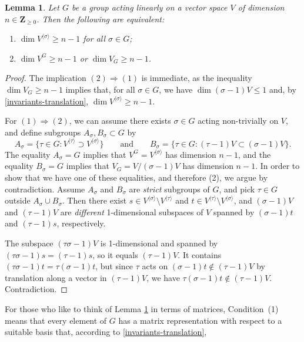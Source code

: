 \documentclass{amsart}
\theoremstyle{plain}
\newtheorem{lemma}[theorem]{Lemma}
\theoremstyle{definition}
\newcommand{\Zee}{{\mathbf{Z}}}
\begin{document}
\begin{lemma}
\label{lemma:groupactions}
Let $G$ be a group acting linearly on a vector space $V$ of 
dimension $n\in\Zee_{\ge0}$.
Then the following are equivalent:
\begin{enumerate}
\item
$\dim V^{\langle\sigma\rangle}\ge n-1$ for all $\sigma \in G$;
\item
$\dim V^G\ge n-1$ or\/  $\dim V_G\ge n-1$.
\end{enumerate}
\end{lemma}
\begin{proof}
The implication $(2)\Rightarrow(1)$ is immediate, as the inequality
$\dim V_G\ge n-1$
implies that, for all $\sigma\in G$,
we have $\dim (\sigma-1)V \le 1$ and,
by \eqref{invariants-translation}, 
$\dim V^{\langle\sigma\rangle}\ge n-1$.

For $(1)\Rightarrow (2)$, we can assume 
there exists $\sigma\in G$ acting non-trivially on $V$,
and define subgroups $A_\sigma, B_\sigma \subset G$ by
$$
A_\sigma=
  \{\tau\in G\colon V^{\langle\tau\rangle} \supset V^{\langle\sigma\rangle} \}
\qquad\text{and}\qquad
B_\sigma=
  \{\tau\in G\colon (\tau-1)V \subset (\sigma-1)V \}.
$$
The equality $A_\sigma=G$ implies that $V^G=V^{\langle\sigma\rangle}$
has dimension $n-1$, and the equality $B_\sigma=G$ implies that 
$V_G=V/(\sigma-1)V$ has dimension $n-1$.
In order to show that we have one of these equalities, and therefore (2),
we argue by contradiction. 
Assume $A_\sigma$ and $B_\sigma$ are \emph{strict} subgroups of $G$, and
pick $\tau\in G$ outside $A_\sigma\cup B_\sigma$.
Then there exist 
$s\in V^{\langle\sigma\rangle}\setminus V^{\langle\tau\rangle}$
and
$t\in V^{\langle\tau\rangle}\setminus V^{\langle\sigma\rangle}$,
and $(\sigma-1)V$ and $(\tau-1)V$ are \emph{different} 1-dimensional
subspaces of $V$ spanned by $(\sigma-1) t$ and $(\tau-1)s$, respectively.

The subspace $(\tau\sigma-1)V$ is 1-dimensional and spanned by
$(\tau\sigma-1)s=(\tau-1)s$, so it equals $(\tau-1)V$.
It contains $(\tau\sigma-1)t=\tau(\sigma-1)t$, but
since $\tau$ acts on $(\sigma-1)t\notin (\tau-1)V$
by translation along a vector in $(\tau-1)V$,
we have $\tau(\sigma-1)t\notin (\tau-1)V$. Contradiction.
\end{proof}
\noindent
For those who like to think of Lemma \ref{lemma:groupactions}
in terms of matrices, Condition~(1) means that every element of $G$ 
has a matrix representation with respect to a suitable basis that, 
according to \eqref{invariants-translation},
\end{document}
